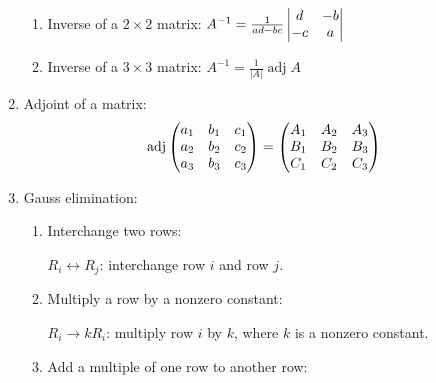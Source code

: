 \documentclass{report}
\begin{document}
\begin{multicols}{2}
\begin{enumerate}
              \begin{enumerate}
                  \item Inverse of a $2\times 2$ matrix: $A^{-1} = \frac{1}{ad-bc}\begin{vmatrix} d & -b \\ -c & a
                            \end{vmatrix}$
                  \item Inverse of a $3\times 3$ matrix: $A^{-1} = \frac{1}{|A|} \operatorname{adj}A$
              \end{enumerate}
        \item Adjoint of a matrix: \[\operatorname{adj}\begin{pmatrix} a_1 & b_1 & c_1 \\ a_2 & b_2 & c_2
                      \\ a_3 & b_3 & c_3 \end{pmatrix} = \begin{pmatrix}A_1& A_2& A_3 \\ B_1& B_2& B_3 \\ C_1& C_2& C_3\end{pmatrix}\]
        \item Gauss elimination:
              \begin{enumerate}
                  \item Interchange two rows:

                        $R_i \leftrightarrow R_j$: interchange row $i$ and row
                        $j$.
                  \item Multiply a row by a nonzero constant:

                        $R_i \rightarrow kR_i$: multiply row $i$
                        by $k$, where $k$ is a nonzero constant.
                  \item Add a multiple of one row to another row:


\end{enumerate}
\end{enumerate}
\end{multicols}
\end{document}
